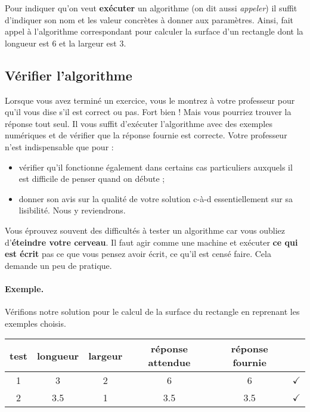 			Pour indiquer qu'on veut \textbf{exécuter} un algorithme
			(on dit aussi \emph{appeler})
			il suffit d'indiquer son nom 
			et les valeur concrètes à donner aux paramètres.
			Ainsi, 
			fait appel à l'algorithme correspondant
			pour calculer la surface d'un rectangle
			dont la longueur est $6$
			et la largeur est $3$.

		\subsection{Vérifier l'algorithme}
		
			Lorsque vous avez terminé un exercice,
			vous le montrez à votre professeur pour qu'il
			vous dise s'il est correct ou pas.
			Fort bien !
			Mais vous pourriez trouver la réponse tout seul.
			Il vous suffit d'exécuter l'algorithme
			avec des exemples numériques et de vérifier que la réponse
			fournie est correcte.
			Votre professeur n'est indispensable que pour :
			\begin{itemize}
			\item
				vérifier qu'il fonctionne également
				dans certains cas particuliers
				auxquels il est difficile de penser quand on débute ;
			\item
				donner son avis sur la qualité de votre solution
				c-à-d essentiellement sur sa lisibilité.
				Nous y reviendrons.
			\end{itemize}
		
			Vous éprouvez souvent des difficultés à tester un algorithme
			car vous oubliez d'\textbf{éteindre votre cerveau}.
			Il faut agir comme une machine
			et exécuter \textbf{ce qui est écrit} 
			pas ce que vous pensez avoir écrit,
			ce qu'il est censé faire.
			Cela demande un peu de pratique.

			\paragraph{Exemple.} 
			Vérifions notre solution 
			pour le calcul de la surface du rectangle
			en reprenant les exemples choisis.
			
			\begin{center}
			\begin{tabular}{|c|cccc|c|}
			\hline
			test \no & longueur & largeur & réponse attendue & réponse fournie & {} \\\hline
			\hline 
			1 & 3   & 2 & 6   & 6   & {\color{ForestGreen}$\checkmark$} \\\hline
			2 & 3.5 & 1 & 3.5 & 3.5 & {\color{ForestGreen}$\checkmark$} \\\hline
			\end{tabular}
			\end{center}				
			
